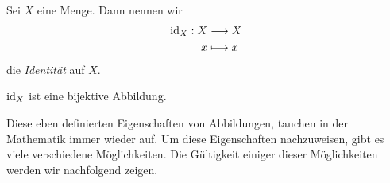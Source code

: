 
\begin{defin}

  Sei $X$ eine Menge. Dann nennen wir
  \begin{align*}
    \operatorname{id}_{X}: X &\longrightarrow X \\
    x &\longmapsto x
  \end{align*}
  die \emph{Identität} auf $X$.

\end{defin}


\begin{anm}

  $\operatorname{id}_{X}$ ist eine bijektive Abbildung.

\end{anm}


Diese eben definierten Eigenschaften von Abbildungen, tauchen in der
Mathematik immer wieder auf. Um diese Eigenschaften nachzuweisen, gibt es
viele verschiedene Möglichkeiten. Die Gültigkeit einiger dieser
Möglichkeiten werden wir nachfolgend zeigen.


